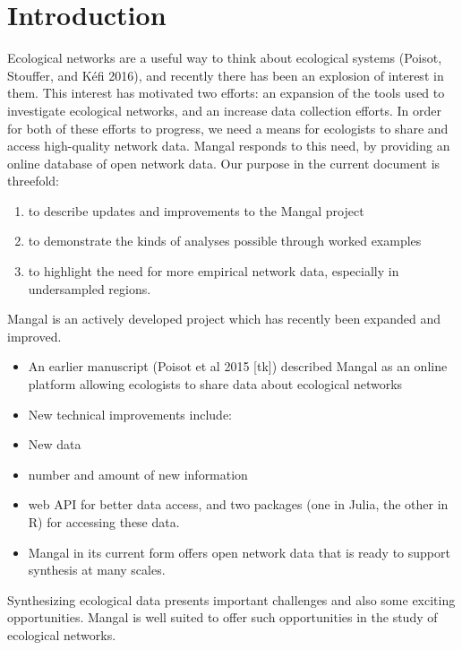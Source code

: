 \hypertarget{introduction}{%
\section{Introduction}\label{introduction}}

Ecological networks are a useful way to think about ecological systems
(Poisot, Stouffer, and Kéfi 2016), and recently there has been an
explosion of interest in them. This interest has motivated two efforts:
an expansion of the tools used to investigate ecological networks, and
an increase data collection efforts. In order for both of these efforts
to progress, we need a means for ecologists to share and access
high-quality network data. Mangal responds to this need, by providing an
online database of open network data. Our purpose in the current
document is threefold:

\begin{enumerate}
\def\labelenumi{\arabic{enumi}.}
\tightlist
\item
  to describe updates and improvements to the Mangal project
\item
  to demonstrate the kinds of analyses possible through worked examples
\item
  to highlight the need for more empirical network data, especially in
  undersampled regions.
\end{enumerate}

Mangal is an actively developed project which has recently been expanded
and improved.

\begin{itemize}
\tightlist
\item
  An earlier manuscript (Poisot et al 2015 {[}tk{]}) described Mangal as
  an online platform allowing ecologists to share data about ecological
  networks
\item
  New technical improvements include:
\item
  New data
\item
  number and amount of new information
\item
  web API for better data access, and two packages (one in Julia, the
  other in R) for accessing these data.
\item
  Mangal in its current form offers open network data that is ready to
  support synthesis at many scales.
\end{itemize}

Synthesizing ecological data presents important challenges and also some
exciting opportunities. Mangal is well suited to offer such
opportunities in the study of ecological networks.

